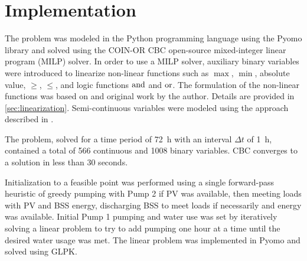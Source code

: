 \section{Implementation}
\label{sec:implementation}

The problem was modeled in the Python programming language using the Pyomo library\cite{hart2011pyomo,bynum2021pyomo} and solved using the COIN-OR CBC\cite{CBC} open-source mixed-integer linear program (MILP) solver. In order to use a MILP solver, auxiliary binary variables were introduced to linearize non-linear functions such as $\max$, $\min$, absolute value, $\ge$, $\le$, and logic functions $\operatorname{and}$ and $\operatorname{or}$. The formulation of the non-linear functions was based on \cite{YALPMIP_logic} and original work by the author. Details are provided in \cref{sec:linearization}.
Semi-continuous variables were modeled using the approach described in \cite{MILP_handout}.

The problem, solved for a time period of \SI{72}{h} with an interval $\Delta t$ of \SI{1}{h}, contained a total of 566 continuous and 1008 binary variables. CBC converges to a solution in less than 30 seconds.

Initialization to a feasible point was performed using a single forward-pass heuristic of greedy pumping with Pump 2 if PV was available, then meeting loads with PV and BSS energy, discharging BSS to meet loads if necessarily and energy was available. Initial Pump 1 pumping and water use was set by iteratively solving a linear problem to try to add pumping one hour at a time until the desired water usage was met. The linear problem was implemented in Pyomo and solved using GLPK\cite{GLPK}.